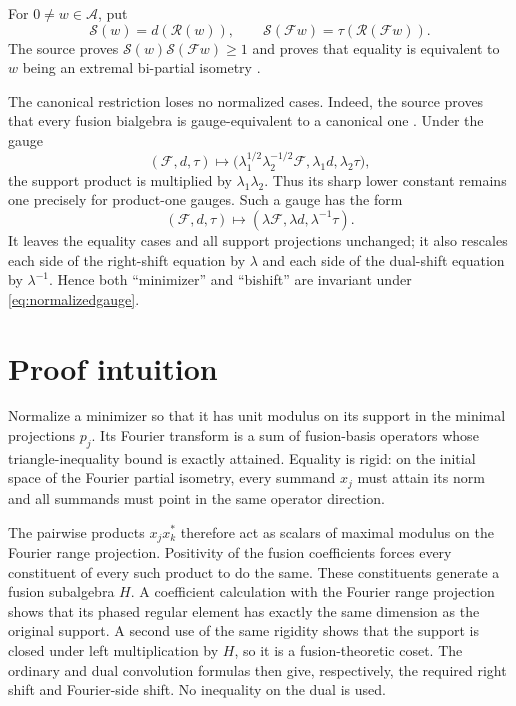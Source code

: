 \documentclass[11pt]{amsart}
\newcommand{\A}{\mathcal A}
\newcommand{\F}{\mathcal F}
\newcommand{\Rng}{\mathcal R}
\begin{document}
For $0\ne w\in\A$, put
\[
 \mathcal S(w)=d(\Rng(w)),\qquad
 \mathcal S(\F w)=\tau(\Rng(\F w)).
\]
The source proves $\mathcal S(w)\mathcal S(\F w)\geq1$ and proves that
equality is equivalent to $w$ being an extremal bi-partial isometry
\cite[Section~6]{LPW}.

The canonical restriction loses no normalized cases.  Indeed, the source
proves that every fusion bialgebra is gauge-equivalent to a canonical one
\cite[Proposition~2.15 and Theorem~2.16]{LPW}.  Under the gauge
\[
 (\F,d,\tau)\longmapsto
 \bigl(\lambda_1^{1/2}\lambda_2^{-1/2}\F,
       \lambda_1d,\lambda_2\tau\bigr),
\]
the support product is multiplied by $\lambda_1\lambda_2$.  Thus its sharp
lower constant remains one precisely for product-one gauges.  Such a gauge
has the form
\begin{equation}\label{eq:normalizedgauge}
 (\F,d,\tau)\longmapsto(\lambda\F,\lambda d,\lambda^{-1}\tau).
\end{equation}
It leaves the equality cases and all support projections unchanged; it also
rescales each side of the right-shift equation by $\lambda$ and each side of
the dual-shift equation by $\lambda^{-1}$.  Hence both ``minimizer'' and
``bishift'' are invariant under \eqref{eq:normalizedgauge}.

\section*{Proof intuition}

Normalize a minimizer so that it has unit modulus on its support in the
minimal projections $p_j$.  Its Fourier transform is a sum of fusion-basis
operators whose triangle-inequality bound is exactly attained.  Equality is
rigid: on the initial space of the Fourier partial isometry, every summand
$x_j$ must attain its norm and all summands must point in the same operator
direction.

The pairwise products $x_jx_k^*$ therefore act as scalars of maximal modulus
on the Fourier range projection.  Positivity of the fusion coefficients
forces every constituent of every such product to do the same.  These
constituents generate a fusion subalgebra $H$.  A coefficient calculation
with the Fourier range projection shows that its phased regular element has
exactly the same dimension as the original support.  A second use of the
same rigidity shows that the support is closed under left multiplication by
$H$, so it is a fusion-theoretic coset.  The ordinary and dual convolution
formulas then give, respectively, the required right shift and Fourier-side
shift.  No inequality on the dual is used.
\end{document}
